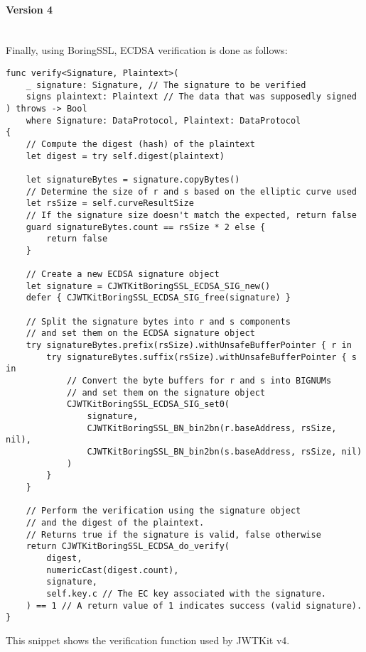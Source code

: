 \paragraph{Version 4} \mbox{} \\
Finally, using BoringSSL, ECDSA verification is done as follows:
\begin{verbatim}
func verify<Signature, Plaintext>(
    _ signature: Signature, // The signature to be verified
    signs plaintext: Plaintext // The data that was supposedly signed
) throws -> Bool
    where Signature: DataProtocol, Plaintext: DataProtocol
{
    // Compute the digest (hash) of the plaintext
    let digest = try self.digest(plaintext)

    let signatureBytes = signature.copyBytes()
    // Determine the size of r and s based on the elliptic curve used
    let rsSize = self.curveResultSize 
    // If the signature size doesn't match the expected, return false
    guard signatureBytes.count == rsSize * 2 else {
        return false
    }

    // Create a new ECDSA signature object
    let signature = CJWTKitBoringSSL_ECDSA_SIG_new()
    defer { CJWTKitBoringSSL_ECDSA_SIG_free(signature) }

    // Split the signature bytes into r and s components 
    // and set them on the ECDSA signature object
    try signatureBytes.prefix(rsSize).withUnsafeBufferPointer { r in
        try signatureBytes.suffix(rsSize).withUnsafeBufferPointer { s in
            // Convert the byte buffers for r and s into BIGNUMs 
            // and set them on the signature object
            CJWTKitBoringSSL_ECDSA_SIG_set0(
                signature,
                CJWTKitBoringSSL_BN_bin2bn(r.baseAddress, rsSize, nil),
                CJWTKitBoringSSL_BN_bin2bn(s.baseAddress, rsSize, nil)
            )
        }
    }

    // Perform the verification using the signature object 
    // and the digest of the plaintext.
    // Returns true if the signature is valid, false otherwise
    return CJWTKitBoringSSL_ECDSA_do_verify(
        digest,
        numericCast(digest.count),
        signature,
        self.key.c // The EC key associated with the signature.
    ) == 1 // A return value of 1 indicates success (valid signature).
}
\end{verbatim}
This snippet shows the verification function used by JWTKit v4. \cite{jwtkit-4}
